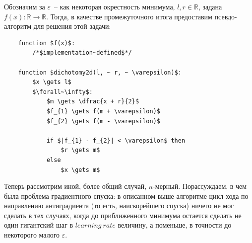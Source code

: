 \documentclass[12pt, a4paper, oneside, final]{article}
\begin{document}
	Обозначим за $\varepsilon$~-- как некоторая окрестность минимума, $l, r \in \mathbb{R}$, задана $f(x) : \mathbb{R} \to \mathbb{R}$. Тогда, в качестве промежуточного итога предоставим псевдо-алгоритм для решения этой задачи:
	\begin{lstlisting}
	function $f(x)$:
		/*$implementation~defined$*/

	function $dichotomy2d(l, ~ r, ~ \varepsilon)$:
		$x \gets l$
		$\forall~\infty$:
			$m \gets \dfrac{x + r}{2}$
			$f_{1} \gets f(m + \varepsilon)$
			$f_{2} \gets f(m - \varepsilon)$

			if $|f_{1} - f_{2}| < \varepsilon$ then
				$r \gets m$
			else
				$x \gets m$
	\end{lstlisting}
	Теперь рассмотрим иной, более общий случай, $n$-мерный. Порассуждаем, в чем была проблема градиентного спуска: в описанном выше алгоритме цикл хода по направлению антиградиента (то есть, наискорейшего спуска) ничего не мог сделать в тех случаях, когда до приближенного минимума остается сделать не один гигантский шаг в $learning~rate$ величину, а поменьше, в точности до некоторого малого $\varepsilon$.
\end{document}

